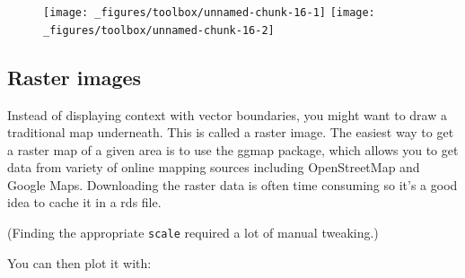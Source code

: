 \begin{figure}[H]
  \texttt{[image: \_figures/toolbox/unnamed-chunk-16-1]}%
  \texttt{[image: \_figures/toolbox/unnamed-chunk-16-2]}
\end{figure}

\subsection{Raster images}

Instead of displaying context with vector boundaries, you might want to
draw a traditional map underneath. This is called a raster image. The
easiest way to get a raster map of a given area is to use the ggmap
package, which allows you to get data from variety of online mapping
sources including OpenStreetMap and Google Maps. Downloading the raster
data is often time consuming so it's a good idea to cache it in a rds
file.  

\begin{Shaded}
\begin{Highlighting}[]
\NormalTok{(}\NormalTok{)) \{}
  \StringTok{ }\NormalTok{(}\NormalTok{)}
  \StringTok{ }\NormalTok{(}
  \NormalTok{)}
  \StringTok{ } \NormalTok{)}
  \NormalTok{)}
\NormalTok{\}}
\end{Highlighting}
\end{Shaded}

(Finding the appropriate \texttt{scale} required a lot of manual
tweaking.)

You can then plot it with:

\begin{Shaded}
\begin{Highlighting}[]

\StringTok{ }
\StringTok{  }\NormalTok{(}\NormalTok{(}  \NormalTok{) +}\StringTok{ }
\StringTok{  }\NormalTok{()}
\end{Highlighting}
\end{Shaded}

